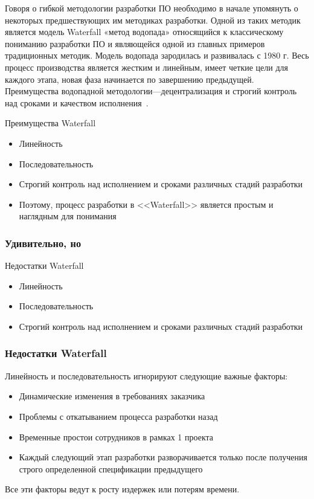\documentclass{../industrial-development}
\begin{document}
\lecturenotes
Говоря о гибкой методологии разработки ПО необходимо в начале упомянуть о некоторых предшествующих им методиках разработки. Одной из таких методик является модель Waterfall «метод водопада» относящийся к классическому пониманию разработки ПО и являющейся одной из главных примеров традиционных методик. Модель водопада зародилась и развивалась с 1980 г.
Весь процесс производства является жестким и линейным, имеет четкие цели для каждого этапа, новая фаза начинается по завершению предыдущей. Преимущества водопадной методологии---децентрализация и строгий контроль над сроками и качеством исполнения~\cite{Winston}.


\begin{frame} 
  \begin{block}{Преимущества Waterfall}
	\begin{itemize}
  \item Линейность 
	\item Последовательность
	\item Строгий контроль над исполнением и сроками различных стадий разработки
  \item Поэтому, процесс разработки в <<Waterfall>> является простым и наглядным для понимания
  \end{itemize}
	\end{block}
\end{frame}

\begin{frame} \frametitle{Удивительно, но}
\begin {block}{Недостатки Waterfall}
  \begin{itemize}
  \item Линейность 
  \item Последовательность 
	\item Строгий контроль над исполнением и сроками различных стадий разработки
  \end{itemize}
\end {block}
\end{frame}

\begin{frame} \frametitle{Недостатки Waterfall}
Линейность и последовательность игнорируют следующие важные факторы:
  \begin{itemize}
  \item Динамические изменения в требованиях заказчика
  \item Проблемы с откатыванием процесса разработки назад
	\item Временные простои сотрудников в рамках 1 проекта
	\item Каждый следующий этап разработки разворачивается только после получения строго определенной спецификации предыдущего
	 \end{itemize}
\begin {block}{}Все эти факторы ведут к \alert {росту издержек} или \alert{потерям времени}.\end {block}
\end{frame}
\end{document}
